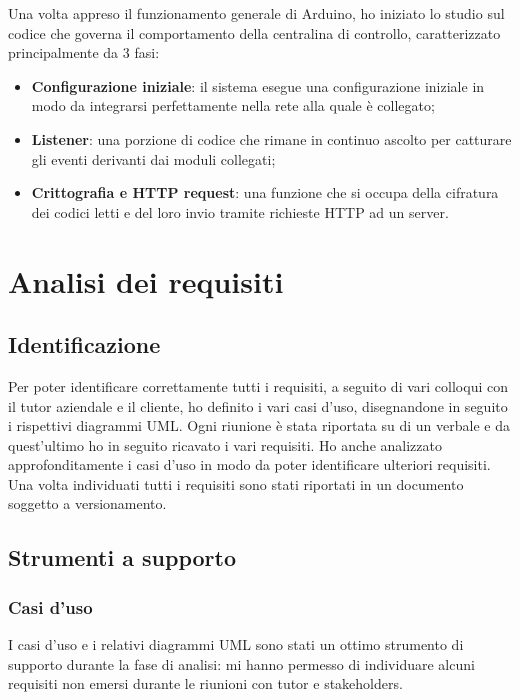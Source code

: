 Una volta appreso il funzionamento generale di Arduino, ho iniziato lo studio sul codice che governa il comportamento della centralina di controllo, caratterizzato principalmente da 3 fasi:

\begin{itemize}
\item \textbf{Configurazione iniziale}: il sistema esegue una configurazione iniziale in modo da integrarsi perfettamente nella rete alla quale è collegato;
\item \textbf{Listener}: una porzione di codice che rimane in continuo ascolto per catturare gli eventi derivanti dai moduli collegati;
\item \textbf{Crittografia e HTTP request}: una funzione che si occupa della cifratura dei codici letti e del loro invio tramite richieste HTTP ad un server.
\end{itemize}

\section{Analisi dei requisiti}
\subsection{Identificazione}
Per poter identificare correttamente tutti i requisiti, a seguito di vari colloqui con il tutor aziendale e il cliente, ho definito i vari casi d'uso, disegnandone in seguito i rispettivi diagrammi UML. Ogni riunione è stata riportata su di un verbale e da quest'ultimo ho in seguito ricavato i vari requisiti. Ho anche analizzato approfonditamente i casi d'uso in modo da poter identificare ulteriori requisiti. Una volta individuati tutti i requisiti sono stati riportati in un documento soggetto a versionamento.

\subsection{Strumenti a supporto}
\subsubsection{Casi d'uso}
I casi d'uso e i relativi diagrammi UML sono stati un ottimo strumento di supporto durante la fase di analisi: mi hanno permesso di individuare alcuni requisiti non emersi durante le riunioni con tutor e stakeholders.

